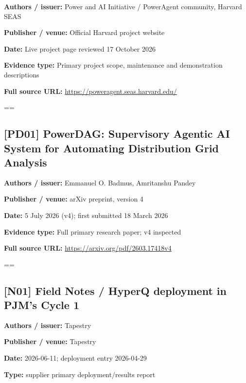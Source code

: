 \documentclass[10pt,letterpaper]{article}
\begin{document}
\textbf{Authors / issuer:} Power and AI Initiative / PowerAgent community, Harvard SEAS\par
\textbf{Publisher / venue:} Official Harvard project website\par
\textbf{Date:} Live project page reviewed 17 October 2026\par
\textbf{Evidence type:} Primary project scope, maintenance and demonstration descriptions\par
\textbf{Full source URL:} \href{https://poweragent.seas.harvard.edu/}{\small\ttfamily https:/\allowbreak{}/\allowbreak{}poweragent.\allowbreak{}seas.\allowbreak{}harvard.\allowbreak{}edu/\allowbreak{}}\par
\egroup\par\noindent\box\readingEntry\par\medskip
\setbox\readingEntry=\vbox\bgroup\hsize=\linewidth\subsection*{[PD01] PowerDAG: Supervisory Agentic AI System for Automating Distribution Grid Analysis}
\textbf{Authors / issuer:} Emmanuel O. Badmus, Amritanshu Pandey\par
\textbf{Publisher / venue:} arXiv preprint, version 4\par
\textbf{Date:} 5 July 2026 (v4); first submitted 18 March 2026\par
\textbf{Evidence type:} Full primary research paper; v4 inspected\par
\textbf{Full source URL:} \href{https://arxiv.org/pdf/2603.17418v4}{\small\ttfamily https:/\allowbreak{}/\allowbreak{}arxiv.\allowbreak{}org/\allowbreak{}pdf/\allowbreak{}2603.\allowbreak{}17418v4}\par
\egroup\par\noindent\box\readingEntry\par\medskip
\setbox\readingEntry=\vbox\bgroup\hsize=\linewidth\subsection*{[N01] Field Notes  /  HyperQ deployment in PJM's Cycle 1}
\textbf{Authors / issuer:} Tapestry\par
\textbf{Publisher / venue:} Tapestry\par
\textbf{Date:} 2026-06-11; deployment entry 2026-04-29\par
\textbf{Type:} supplier primary deployment/results report\par
\end{document}
